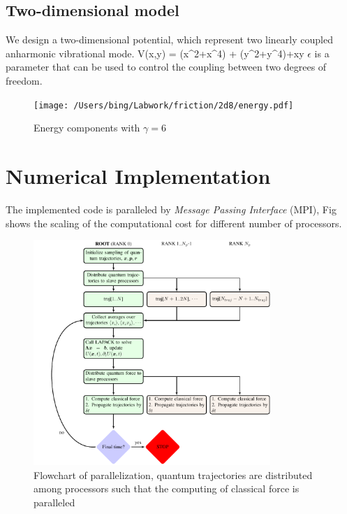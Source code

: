 \documentclass[11pt]{revtex4}
\begin{document}
\subsection{Two-dimensional model}
We design a two-dimensional potential, which represent two linearly coupled anharmonic vibrational mode. 
\be V(x,y) =  (x^2+x^4) +  (y^2+y^4)+\epsilon xy  \ee 
$\epsilon$ is a parameter that can be used to control the coupling between two degrees of freedom.
 
\begin{figure}[htbp]
\texttt{[image: /Users/bing/Labwork/friction/2d8/energy.pdf]}
\caption{Energy components with $\gamma = 6$}
\label{fig:traj_1d}
\end{figure}


\section{Numerical Implementation}
The implemented code is paralleled by \textit{Message Passing Interface} (MPI), Fig \cite{fig:scale} shows the scaling of the computational cost for different number of processors.
\begin{figure}
	\includegraphics[width=0.8\textwidth]{figs/qtm_mpi}
	\caption{Flowchart of parallelization, quantum trajectories are distributed among processors such that the computing of classical force is paralleled} 
\end{figure}
\end{document}
